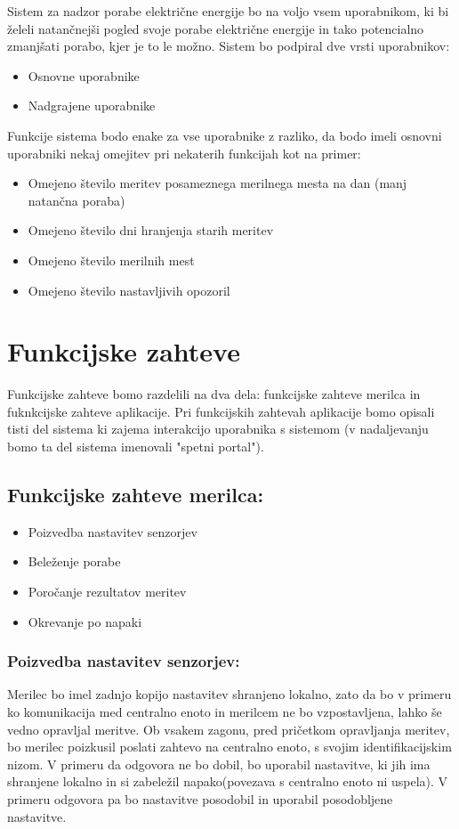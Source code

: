 \documentclass[12pt,a4paper,titlepage,openany]{report}
\begin{document}
\newpage
Sistem za nadzor porabe električne energije bo na voljo vsem uporabnikom, ki bi želeli natančnejši pogled svoje porabe električne energije in tako potencialno zmanjšati porabo, kjer je to le možno. Sistem bo podpiral dve vrsti uporabnikov:
\begin{itemize}
\item Osnovne uporabnike
\item Nadgrajene uporabnike
\end{itemize}
Funkcije sistema bodo enake za vse uporabnike z razliko, da bodo imeli osnovni uporabniki nekaj omejitev pri nekaterih funkcijah kot na primer:
\begin{itemize}
\item Omejeno število meritev posameznega merilnega mesta na dan (manj natančna poraba)
\item Omejeno število dni hranjenja starih meritev
\item Omejeno število merilnih mest
\item Omejeno število nastavljivih opozoril
\end{itemize}


\section{Funkcijske zahteve}
\thispagestyle{fancy}
Funkcijske zahteve bomo razdelili na dva dela: funkcijske zahteve merilca in fuknkcijske zahteve aplikacije. Pri funkcijskih zahtevah aplikacije bomo opisali tisti del sistema ki zajema interakcijo uporabnika s sistemom (v nadaljevanju bomo ta del sistema imenovali "spetni portal").

\subsection{Funkcijske zahteve merilca:}


\begin{itemize}
\item Poizvedba nastavitev senzorjev
\item Beleženje porabe
\item Poročanje rezultatov meritev
\item Okrevanje po napaki
\end{itemize}

\subsubsection{Poizvedba nastavitev senzorjev:}
Merilec bo imel zadnjo kopijo nastavitev shranjeno lokalno, zato da bo v primeru ko komunikacija med centralno enoto in merilcem ne bo vzpostavljena, lahko še vedno opravljal meritve. 
Ob vsakem zagonu, pred pričetkom opravljanja meritev, bo merilec poizkusil poslati zahtevo na centralno enoto, s svojim identifikacijskim nizom. V primeru da odgovora ne bo dobil, bo uporabil nastavitve, ki jih ima shranjene lokalno in si zabeležil napako(povezava s centralno enoto ni uspela). V primeru odgovora pa bo nastavitve posodobil in uporabil posodobljene nastavitve. 
\end{document}
